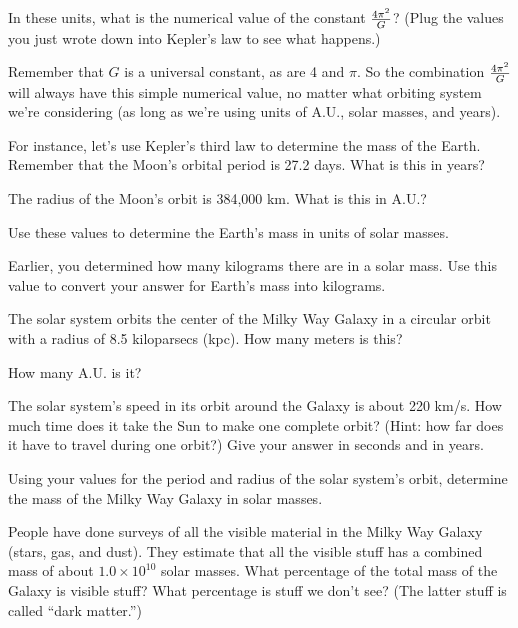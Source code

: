 \vskip 1in

In these units, what is the numerical value of the constant ${4\pi^2\over G}$?
(Plug the values you just wrote down into Kepler's law to see what happens.)

\vskip 1in

Remember that $G$ is a universal constant, as are 4 and $\pi$. 
So the combination ${4\pi^2\over G}$ will always have this simple
numerical value, no matter what orbiting system we're considering (as
long as we're using units of A.U., solar masses, and years).

For instance, let's use Kepler's third law to determine the mass
of the Earth.  Remember that the Moon's orbital period is 27.2 days.
What is this in years?

\vskip 1in

The radius of the Moon's orbit is 384,000 km.  What is this in A.U.?

\vskip 1in

Use these values to determine the Earth's mass in units of solar masses.

\vskip 1.5in

Earlier, you determined how many kilograms there are in a solar mass.
Use this value to convert your answer for Earth's mass into kilograms.

\vskip 1in

The solar system orbits the center of the Milky Way Galaxy in a circular
orbit with a radius of 8.5 kiloparsecs (kpc).  How many meters is this?

\vskip 1in

How many A.U. is it?

\vskip 1in

The solar system's speed in its orbit around the Galaxy is about 220 km/s.
How much time does it take the Sun to make one complete orbit?  (Hint:
how far does it have to travel during one orbit?)  Give your answer in
seconds and in years.

\vskip 2in

Using your values for the period and radius of the solar system's
orbit, determine the mass of the Milky Way Galaxy in solar masses.

\vskip 2in

People have done surveys of all the visible material in the Milky
Way Galaxy (stars, gas, and dust).  They estimate that all the
visible stuff has a combined mass of about $1.0\times 10^{10}$ solar
masses.  What percentage of the total mass of the Galaxy is visible
stuff?  What percentage is stuff we don't see?  (The latter
stuff is called ``dark matter.'')


